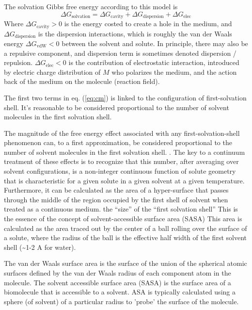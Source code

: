 The solvation Gibbs free energy according to this model is
\begin{equation}
\Delta G_{\mathrm{solvation}}=\Delta G_{\mathrm{cavity}}+\Delta G_{\mathrm{dispersion}}+\Delta G_{\mathrm{elec}}\label{eq:cm}
\end{equation}
Where $\Delta G_{\mathrm{cavity}}>0$ is the energy costed to create
a hole in the medium, and $\Delta G_{\mathrm{dispersion}}$ is the
dispersion interactions, which is roughly the van der Waals energy
$\Delta G_{\mathrm{vdW}}<0$ between the solvent and solute. In principle,
there may also be a repulsive component, and dispersion term is sometimes
denoted dispersion / repulsion. $\Delta G_{\mathrm{elec}}<0$ is the
contribution of electrostatic interaction, introduced by electric
charge distribution of $M$ who polarizes the medium, and the action
back of the medium on the molecule (reaction field). 

The first two terms in eq. (\ref{eq:cm}) is linked to the configuration
of first-solvation shell. It's reasonable to be considered proportional
to the number of solvent molecules in the first solvation shell.

The magnitude of the free energy effect associated with any first-solvation-shell
phenomenon can, to a first approximation, be considered proportional
to the number of solvent molecules in the first solvation shell. \citep{Cramer_1999_implicit_model}.
The key to a continuum treatment of these effects is to recognize
that this number, after averaging over solvent configurations, is
a non-integer continuous function of solute geometry that is characteristic
for a given solute in a given solvent at a given temperature. Furthermore,
it can be calculated as the area of a hyper-surface that passes through
the middle of the region occupied by the first shell of solvent when
treated as a continuous medium. the “size” of the “first solvation
shell” This is the essence of the concept of solvent-accessible surface
area (SASA) \citep{SAS_1,SAS_2} This area is calculated as the area
traced out by the center of a ball rolling over the surface of a solute,
where the radius of the ball is the effective half width of the first
solvent shell (\textasciitilde{}1-2 A for water). 

The van der Waals surface area is the surface of the union of the
spherical atomic surfaces defined by the van der Waals radius of each
component atom in the molecule. The solvent accessible surface area
(SASA) is the surface area of a biomolecule that is accessible to
a solvent. ASA is typically calculated using a sphere (of solvent)
of a particular radius to 'probe' the surface of the molecule. 

